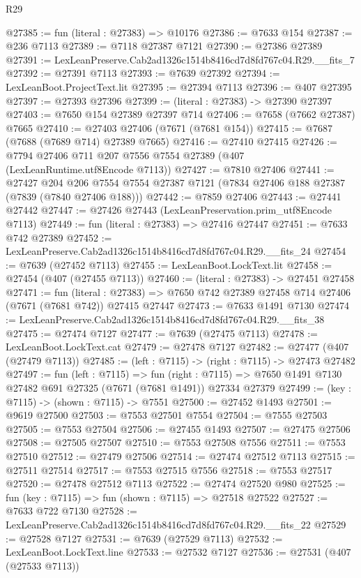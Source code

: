 \begin{lexlean}{R29}
\begin{coremodule}
@27385 := fun (literal : @27383) => @10176
@27386 := @7633 @154
@27387 := @236 @7113
@27389 := @7118 @27387 @7121
@27390 := @27386 @27389
@27391 := LexLeanPreserve.Cab2ad1326c1514b8416cd7d8fd767c04.R29.__fits_7
@27392 := @27391 @7113
@27393 := @7639 @27392
@27394 := LexLeanBoot.ProjectText.lit
@27395 := @27394 @7113
@27396 := @407 @27395
@27397 := @27393 @27396
@27399 := (literal : @27383) -> @27390 @27397
@27403 := @7650 @154 @27389 @27397 @714
@27406 := @7658 (@7662 @27387) @7665
@27410 := @27403 @27406 (@7671 (@7681 @154))
@27415 := @7687 (@7688 (@7689 @714) @27389 @7665)
@27416 := @27410 @27415
@27426 := @7794 @27406 @711 @207 @7556 @7554 @27389 (@407 (LexLeanRuntime.utf8Encode @7113))
@27427 := @7810 @27406
@27441 := @27427
    @204
    @206
    @7554
    @7554
    @27387
    @7121
    (@7834 @27406 @188 @27387 (@7839 (@7840 @27406 @188)))
@27442 := @7859 @27406
@27443 := @27441 @27442
@27447 := @27426 @27443 (LexLeanPreservation.prim_utf8Encode @7113)
@27449 := fun (literal : @27383) => @27416 @27447
@27451 := @7633 @742 @27389
@27452 := LexLeanPreserve.Cab2ad1326c1514b8416cd7d8fd767c04.R29.__fits_24
@27454 := @7639 (@27452 @7113)
@27455 := LexLeanBoot.LockText.lit
@27458 := @27454 (@407 (@27455 @7113))
@27460 := (literal : @27383) -> @27451 @27458
@27471 := fun (literal : @27383) =>
  @7650 @742 @27389 @27458 @714 @27406 (@7671 (@7681 @742)) @27415 @27447
@27473 := @7633 @1491 @7130
@27474 := LexLeanPreserve.Cab2ad1326c1514b8416cd7d8fd767c04.R29.__fits_38
@27475 := @27474 @7127
@27477 := @7639 (@27475 @7113)
@27478 := LexLeanBoot.LockText.cat
@27479 := @27478 @7127
@27482 := @27477 (@407 (@27479 @7113))
@27485 := (left : @7115) -> (right : @7115) -> @27473 @27482
@27497 := fun (left : @7115) =>
  fun (right : @7115) => @7650 @1491 @7130 @27482 @691 @27325 (@7671 (@7681 @1491)) @27334 @27379
@27499 := (key : @7115) -> (shown : @7115) -> @7551
@27500 := @27452 @1493
@27501 := @9619 @27500
@27503 := @7553 @27501 @7554
@27504 := @7555 @27503
@27505 := @7553 @27504
@27506 := @27455 @1493
@27507 := @27475 @27506
@27508 := @27505 @27507
@27510 := @7553 @27508 @7556
@27511 := @7553 @27510
@27512 := @27479 @27506
@27514 := @27474 @27512 @7113
@27515 := @27511 @27514
@27517 := @7553 @27515 @7556
@27518 := @7553 @27517
@27520 := @27478 @27512 @7113
@27522 := @27474 @27520 @980
@27525 := fun (key : @7115) => fun (shown : @7115) => @27518 @27522
@27527 := @7633 @722 @7130
@27528 := LexLeanPreserve.Cab2ad1326c1514b8416cd7d8fd767c04.R29.__fits_22
@27529 := @27528 @7127
@27531 := @7639 (@27529 @7113)
@27532 := LexLeanBoot.LockText.line
@27533 := @27532 @7127
@27536 := @27531 (@407 (@27533 @7113))

\end{coremodule}
\end{lexlean}
